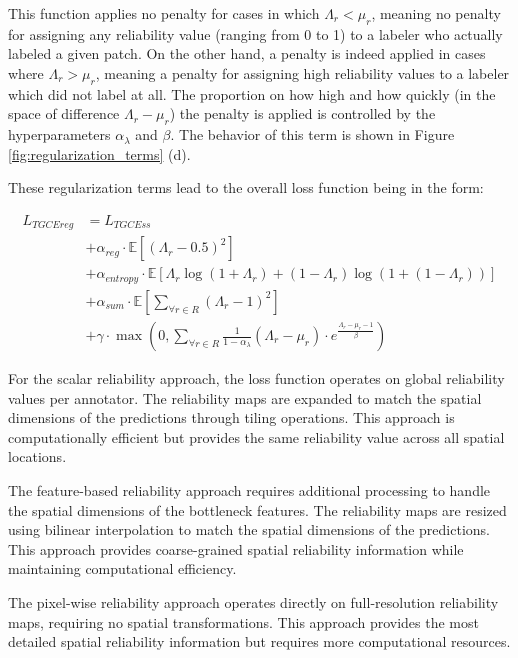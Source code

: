 This function applies no penalty for cases in which  $\Lambda_r <
\mu_r$, meaning no penalty for assigning any reliability value
(ranging from 0 to 1) to a labeler who actually labeled a given patch.
On the other hand, a penalty is indeed applied in cases where
$\Lambda_r > \mu_r$, meaning a penalty for assigning high reliability
values to a labeler which did not label at all. The proportion on how
high and how quickly (in the space of difference $\Lambda_r - \mu_r$)
the penalty is applied is controlled by the hyperparameters $\alpha_{\lambda}$
and $\beta$. The behavior of this term is shown in Figure
\ref{fig:regularization_terms} (d).

These regularization terms lead to the overall loss function being in the form:

\begin{align}
  L_{TGCEreg} &= L_{TGCEss} \\
  &+\alpha_{reg} \cdot \mathbb{E}[(\Lambda_r - 0.5)^2] \nonumber \\
  &+\alpha_{entropy} \cdot \mathbb{E}[\Lambda_r \log(1 + \Lambda_r)
  +(1 - \Lambda_r) \log(1 + (1 - \Lambda_r))] \nonumber \\
  &+\alpha_{sum} \cdot \mathbb{E}[\sum_{\forall r \in R}(\Lambda_r -
  1)^2] \nonumber \\
  &+\gamma \cdot \max \left(0, \sum_{\forall r \in R}
    \frac{1}{1-\alpha_{\lambda}} \left(\Lambda_r - \mu_r\right) \cdot
  e^{\frac{\Lambda_r - \mu_r - 1}{\beta}}\right) \nonumber
\end{align}

For the scalar reliability approach, the loss function operates on
global reliability values per annotator. The reliability maps are
expanded to match the spatial dimensions of the predictions through
tiling operations. This approach is computationally efficient but
provides the same reliability value across all spatial locations.

The feature-based reliability approach requires additional processing
to handle the spatial dimensions of the bottleneck features. The
reliability maps are resized using bilinear interpolation to match
the spatial dimensions of the predictions. This approach provides
coarse-grained spatial reliability information while maintaining
computational efficiency.

The pixel-wise reliability approach operates directly on full-resolution
reliability maps, requiring no spatial transformations. This approach
provides the most detailed spatial reliability information but requires
more computational resources.
